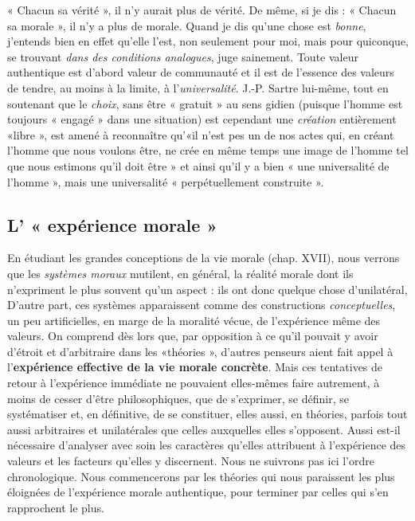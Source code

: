 « Chacun sa vérité », il n’y aurait plus de vérité. De même, si je dis :
« Chacun sa morale », il n’y a plus de morale. Quand je dis qu’une
chose est {\it bonne}, j'entends bien en effet qu’elle l’est, non seulement
pour moi, mais pour quiconque, se trouvant {\it dans des conditions analogues},
juge sainement. Toute valeur authentique est d’abord valeur
de communauté et il est de l’essence des valeurs de tendre, au moins
à la limite, à l’{\it universalité}. J.-P. Sartre lui-même, tout en soutenant
que le {\it choix}, sans être « gratuit » au sens gidien (puisque l’homme est
toujours « engagé » dans une situation) est cependant une {\it création}
entièrement «libre », est amené à reconnaître qu’«il n’est pes un de
nos actes qui, en créant l’homme que nous voulons être, ne crée en
même temps une image de l’homme tel que nous estimons qu’il doit
être » et ainsi qu’il y a bien « une universalité de l’homme », mais une
universalité « perpétuellement construite ».

\subsection{L’ « expérience morale »}%
En étudiant les grandes conceptions
de la vie morale (chap. XVII), nous verrons que les {\it systèmes
moraux} mutilent, en général, la réalité morale dont ils n’expriment
le plus souvent qu’un aspect : ils ont donc quelque chose d’unilatéral,
D'autre part, ces systèmes apparaissent comme des constructions
{\it conceptuelles}, un peu artificielles, en marge de la moralité vécue, de
l'expérience même des valeurs. On comprend dès lors que, par opposition
à ce qu’il pouvait y avoir d'étroit et d’arbitraire dans les
«théories », d’autres penseurs aient fait appel à l’{\bf expérience effective
de la vie morale concrète}. Mais ces tentatives de retour à l'expérience
immédiate ne pouvaient elles-mêmes faire autrement, à moins de
cesser d’être philosophiques, que de s’exprimer, se définir, se systématiser
et, en définitive, de se constituer, elles aussi, en théories,
parfois tout aussi arbitraires et unilatérales que celles auxquelles
elles s’opposent. Aussi est-il nécessaire d’analyser avec soin les caractères
qu’elles attribuent à l’expérience des valeurs et les facteurs
qu’elles y discernent. Nous ne suivrons pas ici l’ordre chronologique.
Nous commencerons par les théories qui nous paraissent les plus
éloignées de l'expérience morale authentique, pour terminer par
celles qui s’en rapprochent le plus.

